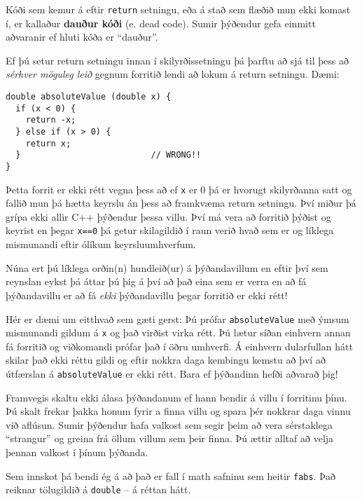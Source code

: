 Kóði sem kemur á eftir {\tt return} setningu, eða á stað sem flæðið mun ekki komast í, er kallaður {\bf dauður kóði} (e. dead code).
Sumir þýðendur gefa einmitt aðvaranir ef hluti kóða er ``dauður''.


Ef þú setur return setningu innan í skilyrðissetningu þá þarftu að sjá til þess að {\em sérhver möguleg leið} gegnum forritið lendi að lokum á return setningu.
Dæmi: 

\begin{verbatim}
double absoluteValue (double x) {
  if (x < 0) {
    return -x;
  } else if (x > 0) {
    return x;
  }                          // WRONG!!
}
\end{verbatim}
%
Þetta forrit er ekki rétt vegna þess að ef {\tt x} er 0 þá er hvorugt skilyrðanna satt og fallið mun þá hætta keyrslu án þess að framkvæma return setningu.
Því miður þá grípa ekki allir C++ þýðendur þessa villu.
Því má vera að forritið þýðist og keyrist en þegar {\tt x==0} þá getur skilagildið í raun verið hvað sem er og líklega mismunandi eftir ólíkum keyrsluumhverfum.


Núna ert þú líklega orðin(n) hundleið(ur) á þýðandavillum en eftir því sem reynslan eykst þá áttar þú þig á því 
að það eina sem er verra en að fá þýðandavillu er að fá {\em ekki} þýðandavillu þegar forritið er ekki rétt!

Hér er dæmi um eitthvað sem gæti gerst: Þú prófar {\tt absoluteValue} með ýmsum mismunandi gildum á {\tt x} og það virðist virka rétt.
Þú lætur síðan einhvern annan fá forritið og viðkomandi prófar það í öðru umhverfi.
Á einhvern dularfullan hátt skilar það ekki réttu gildi og eftir nokkra daga kembingu kemstu að því að útfærslan á {\tt absoluteValue} er ekki rétt.
Bara ef þýðandinn hefði aðvarað þig!


Framvegis skaltu ekki álasa þýðandanum ef hann bendir á villu í forritinu þínu.
Þú skalt frekar þakka honum fyrir a finna villu og spara þér nokkrar daga vinnu við aflúsun.
Sumir þýðendur hafa valkost sem segir þeim að vera sérstaklega ``strangur'' og greina frá öllum villum sem þeir finna.
Þú ættir alltaf að velja þennan valkost í þínum þýðanda.


Sem innskot þá bendi ég á að það er fall í math safninu sem heitir {\tt fabs}.
Það reiknar tölugildið á {\tt double} -- á réttan hátt.

